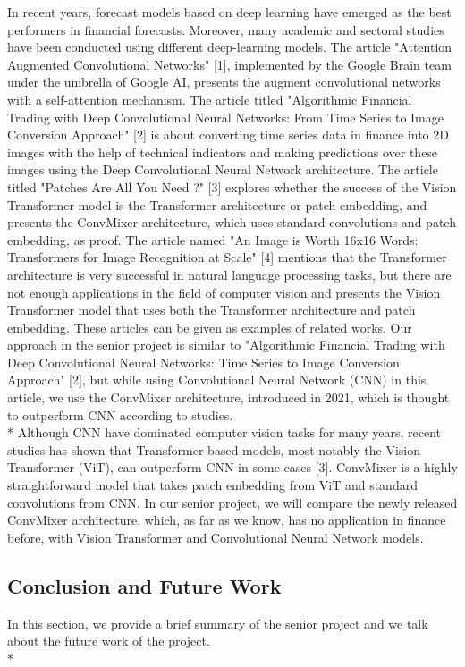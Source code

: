 \documentclass[]{article}
\begin{document}
In recent years, forecast models based on deep learning have emerged as the best performers in financial forecasts. Moreover, many academic and sectoral studies have been conducted using different deep-learning models. The article "Attention Augmented Convolutional Networks" [1], implemented by the Google Brain team under the umbrella of Google AI, presents the augment convolutional networks with a self-attention mechanism. The article titled "Algorithmic Financial Trading with Deep Convolutional Neural Networks: From Time Series to Image Conversion Approach" [2] is about converting time series data in finance into 2D images with the help of technical indicators and making predictions over these images using the Deep Convolutional Neural Network architecture. The article titled "Patches Are All You Need ?" [3] explores whether the success of the Vision Transformer model is the Transformer architecture or patch embedding, and presents the ConvMixer architecture, which uses standard convolutions and patch embedding, as proof. The article named "An Image is Worth 16x16 Words: Transformers for Image Recognition at Scale" [4] mentions that the Transformer architecture is very successful in natural language processing tasks, but there are not enough applications in the field of computer vision and presents the Vision Transformer model that uses both the Transformer architecture and patch embedding. These articles can be given as examples of related works. Our approach in the senior project is similar to "Algorithmic Financial Trading with Deep Convolutional Neural Networks: Time Series to Image Conversion Approach" [2], but while using Convolutional Neural Network (CNN) in this article, we use the ConvMixer architecture, introduced in 2021, which is thought to outperform CNN according to studies.\vspace{0.2cm} \\*
Although CNN have dominated computer vision tasks for many years, recent studies has shown that Transformer-based models, most notably the Vision Transformer (ViT), can outperform CNN in some cases [3]. ConvMixer is a highly straightforward model that takes patch embedding from ViT and standard convolutions from CNN. In our senior project, we will compare the newly released ConvMixer architecture, which, as far as we know, has no application in finance before, with Vision Transformer and Convolutional Neural Network models. 

\begin{center}
    \item\section{Conclusion and Future Work}
\end{center}
In this section, we provide a brief summary of the senior project and we talk about the future work of the project.\\*
\end{document}
